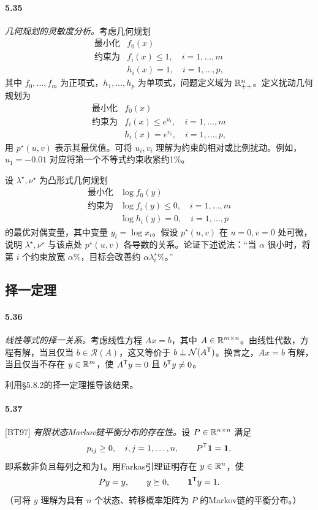 \paragraph{5.35} \emph{几何规划的灵敏度分析。}考虑几何规划
\[
\begin{array}{ll}\text{最小化}&f_0(x)\\
\text{约束为}&f_i(x)\le1,\quad i=1,\ldots,m\\
&h_i(x)=1,\quad i=1,\ldots,p,\end{array}
\]
其中 $f_0,\ldots,f_m$ 为正项式，$h_1,\ldots,h_p$ 为单项式，问题定义域为 $\mathbb R_{++}^n$。定义扰动几何规划为
\[
\begin{array}{ll}\text{最小化}&f_0(x)\\
\text{约束为}&f_i(x)\le e^{u_i},\quad i=1,\ldots,m\\
&h_i(x)=e^{v_i},\quad i=1,\ldots,p,\end{array}
\]
用 $p^\star(u,v)$ 表示其最优值。可将 $u_i,v_i$ 理解为约束的相对或比例扰动。例如，$u_1=-0.01$ 对应将第一个不等式约束收紧约1\%。

设 $\lambda^\star,\nu^\star$ 为凸形式几何规划
\[
\begin{array}{ll}\text{最小化}&\log f_0(y)\\
\text{约束为}&\log f_i(y)\le0,\quad i=1,\ldots,m\\
&\log h_i(y)=0,\quad i=1,\ldots,p\end{array}
\]
的最优对偶变量，其中变量 $y_i=\log x_i$。假设 $p^\star(u,v)$ 在 $u=0,v=0$ 处可微，说明 $\lambda^\star,\nu^\star$ 与该点处 $p^\star(u,v)$ 各导数的关系。论证下述说法：“当 $\alpha$ 很小时，将第 $i$ 个约束放宽 $\alpha\%$，目标会改善约 $\alpha\lambda_i^\star\%$。”

\subsection*{择一定理}
\paragraph{5.36} \emph{线性等式的择一关系。}考虑线性方程 $Ax=b$，其中 $A\in\mathbb R^{m\times n}$。由线性代数，方程有解，当且仅当 $b\in\mathcal R(A)$，这又等价于 $b\perp\mathcal N(A^\mathsf T)$。换言之，$Ax=b$ 有解，当且仅当不存在 $y\in\mathbb R^m$，使 $A^\mathsf T y=0$ 且 $b^\mathsf T y\ne0$。

利用§5.8.2的择一定理推导该结果。

\paragraph{5.37} [BT97] \emph{有限状态Markov链平衡分布的存在性。}设 $P\in\mathbb R^{n\times n}$ 满足
\[
p_{ij}\ge0,\quad i,j=1,\ldots,n,\qquad P^\mathsf T\mathbf 1=\mathbf 1,
\]
即系数非负且每列之和为1。用Farkas引理证明存在 $y\in\mathbb R^n$，使
\[
Py=y,\qquad y\succeq0,\qquad\mathbf 1^\mathsf T y=1.
\]
（可将 $y$ 理解为具有 $n$ 个状态、转移概率矩阵为 $P$ 的Markov链的平衡分布。）

